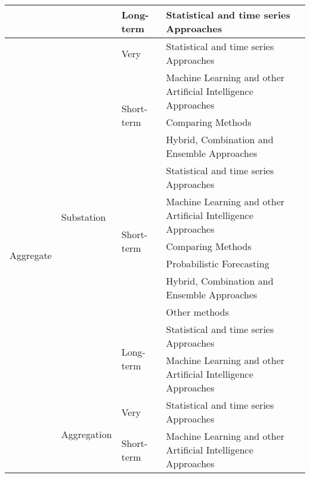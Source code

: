 \begin{table}[]
\begin{tabular}{p{.06\linewidth}p{.08\linewidth}p{.08\linewidth}p{.46\linewidth}p{.29\linewidth}}
		&  & Long-term & Statistical and time series Approaches & \cite{tsekouras2006anl} \\
		\midrule
		\multirow[t]{21}{*}{Aggregate} & \multirow[t]{12}{*}{Substation} & \multirow[t]{1}{*}{Very} & Statistical and time series Approaches & \cite{Ghofrani2011smb, Bracale2013ABB} \\
		&  & \multirow[t]{3}{*}{Short-term} & Machine Learning and other Artificial   Intelligence Approaches & \cite{zhao2020onp, lourenco2012stl, wang2013acv} \\
		&  &  & Comparing Methods & \cite{idowu2016aml, mirowski2014dfi} \\
		&  &  & Hybrid, Combination and Ensemble   Approaches & \cite{Cao2020hed, sulandari2016fel, tajer2017lfv} \\
		&  & \multirow[t]{6}{*}{Short-term} & Statistical and time series Approaches & \cite{Haben2019stl, aprillia2019oda, vincenzo2020cml, borges2020etm, Goude2014lsa, Hayes2015acs, Haben2019stl, espinoza2005stl} \\
		&  &  & Machine Learning and other Artificial   Intelligence Approaches & \cite{bersani2006mol, bersani2006mol, sousa2012atr, ahmad2019dlf, ding2016nnb, stephen2020ngr, fidalgo2005lfp, naeem2020stl, zufferey2020psf, Abreu2018mlf, chen2018dfl} \\
		&  &  & Comparing Methods & \cite{idowu2016aml, mirowski2014dfi, Yunusov2018sss} \\
		&  &  & Probabilistic Forecasting & \cite{Haben2019stl, bikcora2018dfo, kodaira2020oes, zufferey2020psf, bikcora2018dfo} \\
		&  &  & Hybrid, Combination and Ensemble   Approaches & \cite{bogomolov2016ecp, hashim2019anl, Bennett2014flv, sun2015aea, grmanova2016iel, nespoli2020hdf, kodaira2020oes} \\
		&  &  & Other methods & \cite{mcqueen2004mcs} \\
		&  & \multirow[t]{2}{*}{Long-term} & Statistical and time series Approaches & \cite{Friedrich2014mfu, Goude2014lsa} \\
		&  &  & Machine Learning and other Artificial   Intelligence Approaches & \cite{Ye2019adb} \\
		\cmidrule(lr){2-5}
		& \multirow[t]{9}{*}{Aggregation} & \multirow[t]{1}{*}{Very} & Statistical and time series Approaches & \cite{perfumo2014mbe} \\
		&  & \multirow[t]{2}{*}{Short-term} & Machine Learning and other Artificial   Intelligence Approaches & \cite{lin2020ecp, Elvers2019spl, voss2018residential, voss2018adjusted} \\

\end{tabular}
\end{table}

